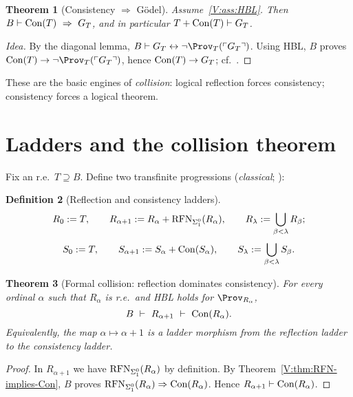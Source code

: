 \documentclass[11pt]{article}
\newtheorem{theorem}{Theorem}[section]
\theoremstyle{definition}
\newtheorem{definition}[theorem]{Definition}
\theoremstyle{remark}
\begin{document}
\begin{theorem}[Consistency $\Rightarrow$ G\"odel]\label{V:thm:Con-implies-G}
Assume~\ref{V:ass:HBL}. Then \(B\vdash \mathrm{Con}(T)\ \Rightarrow\ G_T\), and in particular \(T+\mathrm{Con}(T)\vdash G_T\).
\end{theorem}

\begin{proof}[Idea]
By the diagonal lemma, \(B\vdash G_T\leftrightarrow \neg\Prov_T(\ulcorner G_T\urcorner)\).
Using HBL, \(B\) proves \(\Con(T)\to \neg\Prov_T(\ulcorner G_T\urcorner)\), hence \(\mathrm{Con}(T)\to G_T\); cf.\ \cite{HajekPudlak}.
\end{proof}

These are the basic engines of \emph{collision}: logical reflection forces consistency; consistency forces a logical theorem.

\section{Ladders and the collision theorem}

Fix an r.e.\ \(T\supseteq B\). Define two transfinite progressions (\emph{classical}; \cite{Turing1939,Feferman1962}):

\begin{definition}[Reflection and consistency ladders]\label{V:def:ladders}
\[
R_0:=T,\qquad R_{\alpha+1}:=R_\alpha+\mathrm{RFN}_{\Sigma^0_1}(R_\alpha),\qquad R_\lambda:=\bigcup_{\beta<\lambda}R_\beta;
\]
\[
S_0:=T,\qquad S_{\alpha+1}:=S_\alpha+\mathrm{Con}(S_\alpha),\qquad S_\lambda:=\bigcup_{\beta<\lambda}S_\beta.
\]
\end{definition}

\begin{theorem}[Formal collision: reflection dominates consistency]\label{V:thm:collision}
For every ordinal \(\alpha\) such that \(R_\alpha\) is r.e.\ and HBL holds for \(\Prov_{R_\alpha}\),
\[
B\ \vdash\ R_{\alpha+1}\ \vdash\ \Con(R_\alpha).
\]
Equivalently, the map \(\alpha\mapsto \alpha{+}1\) is a \emph{ladder morphism} from the reflection ladder to the consistency ladder.
\end{theorem}

\begin{proof}
In \(R_{\alpha+1}\) we have \(\mathrm{RFN}_{\Sigma^0_1}(R_\alpha)\) by definition. By Theorem~\ref{V:thm:RFN-implies-Con},
\(B\) proves \(\mathrm{RFN}_{\Sigma^0_1}(R_\alpha)\Rightarrow \mathrm{Con}(R_\alpha)\). Hence \(R_{\alpha+1}\vdash \mathrm{Con}(R_\alpha)\).
\end{proof}
\end{document}
